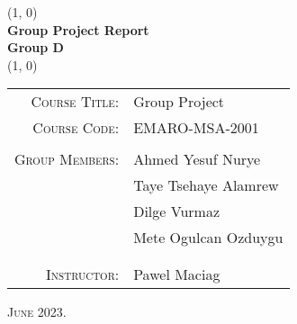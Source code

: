 \begin{titlepage}
	\begin{center}
		\line(1, 0){\textwidth}\\
		\vspace{2mm}
		\huge{\bfseries Group Project Report\\Group D}\\
		\vspace{2mm}
		\line(1, 0){\textwidth}\\
		\vspace{3cm}
	\end{center}

	\begin{table}[H]
		\centering
		\begin{tabular}{r l}
			\textsc{Course Title:} & Group Project\\
			\textsc{Course Code:} & EMARO-MSA-2001\\
			&\\
			\textsc{Group Members:} & Ahmed Yesuf Nurye\\
			& Taye Tsehaye Alamrew\\
			& Dilge Vurmaz\\
			& Mete Ogulcan Ozduygu\\
			&\\
			&\\
			\textsc{Instructor:} & Pawel Maciag\\
		\end{tabular}
	\end{table}
	\vspace{4cm}
	\begin{center}
		\textsc{June 2023.}
	\end{center}
\end{titlepage}